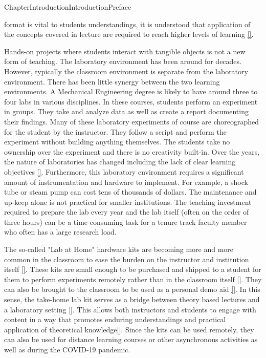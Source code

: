 \documentclass[oneside,10pt,]{book}
\newcommand{\xreffont}{\relax}
\newcommand{\linkhilite}[1]{\underline{#1}}
\numberwithin{equation}{section}
\begin{document}
\begin{chapterptx}{Chapter}{Introduction}{}{Introduction}{}{}{Preface}
\begin{introduction}{}
format is vital to students understandings, it is understood that application of the concepts covered in lecture are required to reach higher levels of learning \hyperlink{Armstrong}{\linkhilite{[{\xreffont 19}]}}.%
\par
Hands-on projects where students interact with tangible objects is not a new form of teaching. The laboratory environment has been around for decades. However, typically the classroom environment is separate from the laboratory environment. There has been little synergy between the two learning environments. A Mechanical Engineering degree is likely to have around three to four labs in various disciplines. In these courses, students perform an experiment in groups. They take and analyze data as well as create a report documenting their findings. Many of these laboratory experiments of course are choreographed for the student by the instructor. They follow a script and perform the experiment without building anything themselves. The students take no ownership over the experiment and there is no creativity built-in. Over the years, the nature of laboratories has changed including the lack of clear learning objectives \hyperlink{Labs}{\linkhilite{[{\xreffont 20}]}}. Furthermore, this laboratory environment requires a significant amount of instrumentation and hardware to implement. For example, a shock tube or steam pump can cost tens of thousands of dollars. The maintenance and up-keep alone is not practical for smaller institutions. The teaching investment required to prepare the lab every year and the lab itself (often on the order of three hours) can be a time consuming task for a tenure track faculty member who often has a large research load.%
\par
The so-called "Lab at Home" hardware kits are becoming more and more common in the classroom to ease the burden on the instructor and institution itself \hyperlink{LabAtHome}{\linkhilite{[{\xreffont 21}]}}. These kits are small enough to be purchased and shipped to a student for them to perform experiments remotely rather than in the classroom itself \hyperlink{LabAtHome1}{\linkhilite{[{\xreffont 22}]}}. They can also be brought to the classroom to be used as a personal demo aid \hyperlink{LabAtHome2-EE}{\linkhilite{[{\xreffont 23}]}}. In this sense, the take-home lab kit serves as a bridge between theory based lectures and a laboratory setting \hyperlink{LabAtHome3}{\linkhilite{[{\xreffont 24}]}}. This allows both instructors and students to engage with content in a way that promotes enduring understandings and practical application of theoretical knowledge\hyperlink{LabAtHome4-EE}{\linkhilite{[{\xreffont 25}]}}. Since the kits can be used remotely, they can also be used for distance learning courses or other asynchronous activities as well as during the COVID-19 pandemic.%

\end{introduction}
\end{chapterptx}
\end{document}
